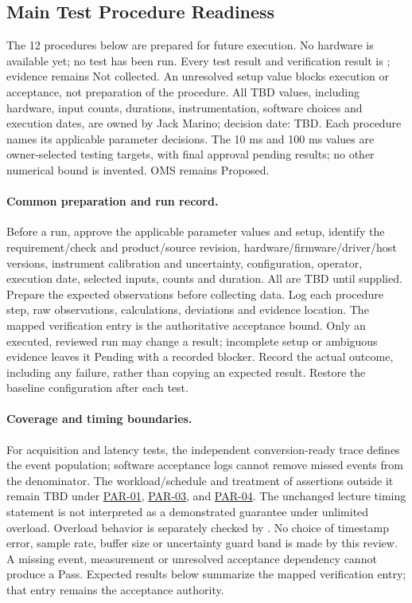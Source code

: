 \subsection{Main Test Procedure Readiness}
\label{Section:MainTestProcedures}
The 12 procedures below are prepared for future execution. No hardware is
available yet; no test has been run. Every test result and verification result
is \StatusPending; evidence remains Not collected. An unresolved setup value
blocks execution or acceptance, not preparation of the procedure.
All TBD values, including hardware, input counts, durations, instrumentation,
software choices and execution dates, are owned by Jack Marino; decision date:
TBD. Each procedure names its applicable parameter decisions. The 10 ms and
100 ms values are owner-selected testing targets, with final approval pending
results; no other numerical bound is invented. OMS remains Proposed.

\paragraph{Common preparation and run record.}
Before a run, approve the applicable parameter values and setup, identify the
requirement/check and product/source revision, hardware/firmware/driver/host
versions, instrument calibration and uncertainty, configuration, operator,
execution date, selected inputs, counts and duration. All are TBD until supplied.
Prepare the expected observations before collecting data. Log each procedure
step, raw observations, calculations, deviations and evidence location.
The mapped verification entry is the authoritative acceptance bound.
Only an executed, reviewed run may change a result; incomplete setup or
ambiguous evidence leaves it Pending with a recorded blocker. Record the
actual outcome, including any failure, rather than copying an expected result.
Restore the baseline configuration after each test.

\paragraph{Coverage and timing boundaries.}\label{Section:TestReviewClarifications}
For acquisition and latency tests, the independent conversion-ready trace defines the event population; software acceptance logs cannot remove missed events from the denominator. The workload/schedule and treatment of assertions outside it remain TBD under \hyperref[Parameter:PAR-01]{PAR-01}, \hyperref[Parameter:PAR-03]{PAR-03}, and \hyperref[Parameter:PAR-04]{PAR-04}. The unchanged lecture timing statement is not interpreted as a demonstrated guarantee under unlimited overload. Overload behavior is separately checked by . No choice of timestamp error, sample rate, buffer size or uncertainty guard band is made by this review. A missing event, measurement or unresolved acceptance dependency cannot produce a Pass. Expected results below summarize the mapped verification entry; that entry remains the acceptance authority.


